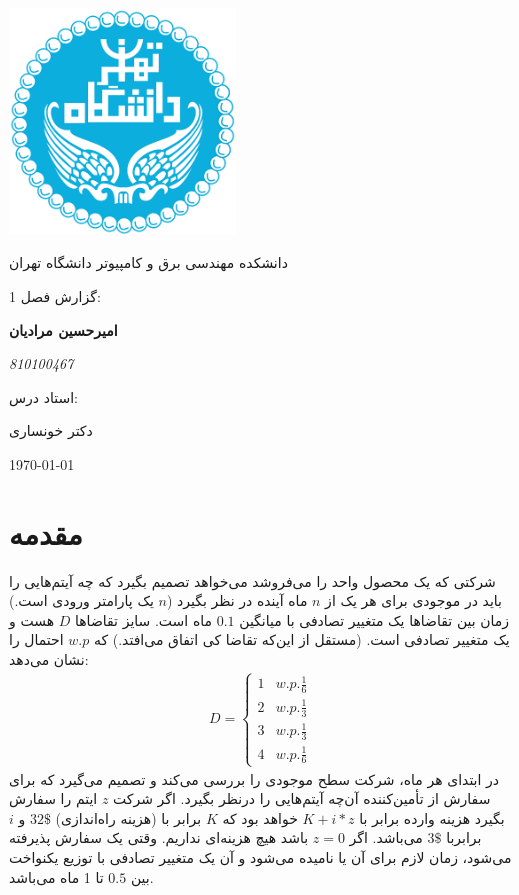 \documentclass[12pt,a4paper]{report}
\begin{document}
	\begin{titlepage}
		\centering
		\includegraphics[width=0.45\textwidth]{Figures/logo}\par\vspace{1cm}
		{\scshape\LARGE  دانشکده مهندسی برق و کامپیوتر دانشگاه تهران \par}
		\vspace{1cm}
		{\scshape\Large  گزارش فصل 1: \par}
		\vspace{1.5cm}
		{\huge\bfseries امیرحسین مرادیان\par}
		\vspace{0.5cm}
		{\Large\itshape 810100467\par}
		\vfill
		\huge {استاد درس:}
		\par
		دکتر خونساری
		
		\vfill
		
		{\large \today\par}
	\end{titlepage}
	
	\pagebreak
	
	\section*{مقدمه}
شرکتی که یک محصول واحد را می‌فروشد می‌خواهد تصمیم بگیرد که چه آیتم‌هایی را باید در موجودی برای هر یک از $n$ ماه آینده در نظر بگیرد ($n$ یک پارامتر ورودی  است.) زمان بین تقاضاها یک متغییر تصادفی با میانگین $0.1$ ماه است. سایز تقاضاها $D$ هست و یک متغییر تصادفی است. (مستقل از این‌که تقاضا کی اتفاق می‌افتد.) که $w.p$ احتمال را نشان می‌دهد:
\begin{align*}
	D=\begin{cases} 1& w.p. \frac{1}{6}\\
		2&w.p. \frac{1}{3}\\
		3& w.p. \frac{1}{3}\\
		4& w.p. \frac{1}{6}\end{cases}
\end{align*}
در ابتدای هر ماه، شرکت سطح موجودی را بررسی می‌کند و تصمیم می‌گیرد که برای سفارش از تأمین‌کننده آن‌چه آیتم‌هایی را درنظر بگیرد. اگر شرکت $z$ ایتم را سفارش بگیرد هزینه وارده برابر با $K+i*z$ خواهد بود که $K$ برابر با (هزینه راه‌اندازی) $32\$$ و $i$ برابربا  $3\$$ می‌باشد. اگر $z=0$ باشد هیچ هزینه‌ای نداریم. وقتی یک سفارش پذیرفته می‌شود، زمان لازم برای آن
 یا 
نامیده می‌شود و آن یک متغییر تصادفی با توزیع یکنواخت بین $0.5$ تا 1 ماه می‌باشد.
\end{document}
